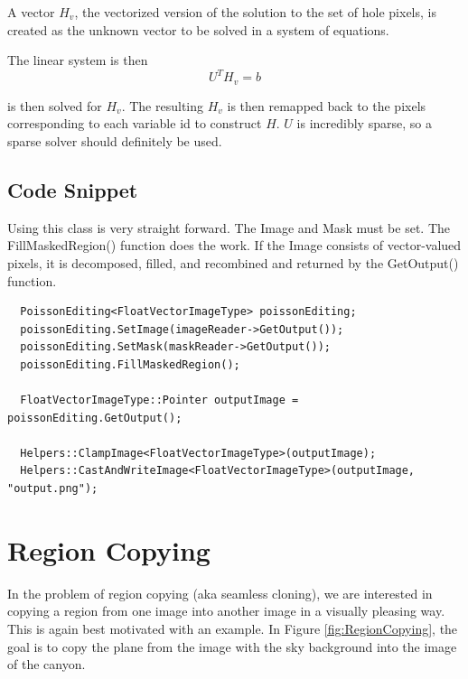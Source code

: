 \documentclass{InsightArticle}
\begin{document}
A vector $H_v$, the vectorized version of the solution to the set of hole pixels, is created as the unknown vector to be solved in a system of equations.

The linear system is then
\begin{equation}
 U^T H_v = b
\end{equation}

is then solved for $H_v$. The resulting $H_v$ is then remapped back to the pixels corresponding to each variable id to construct $H$. $U$ is incredibly sparse, so a sparse solver should definitely be used.

\subsection{Code Snippet}

Using this class is very straight forward. The Image and Mask must be set. The FillMaskedRegion() function does the work. If the Image consists of vector-valued pixels, it is decomposed, filled, and recombined and returned by the GetOutput() function.

\begin{verbatim}
  PoissonEditing<FloatVectorImageType> poissonEditing;
  poissonEditing.SetImage(imageReader->GetOutput());
  poissonEditing.SetMask(maskReader->GetOutput());
  poissonEditing.FillMaskedRegion();

  FloatVectorImageType::Pointer outputImage = poissonEditing.GetOutput();

  Helpers::ClampImage<FloatVectorImageType>(outputImage);
  Helpers::CastAndWriteImage<FloatVectorImageType>(outputImage, "output.png");
\end{verbatim}


\section{Region Copying}
\label{sec:RegionCopying}
In the problem of region copying (aka seamless cloning), we are interested in copying a region from one image into another image in a visually pleasing way. This is again best motivated with an example. In Figure \ref{fig:RegionCopying}, the goal is to copy the plane from the image with the sky background into the image of the canyon. 
\end{document}
